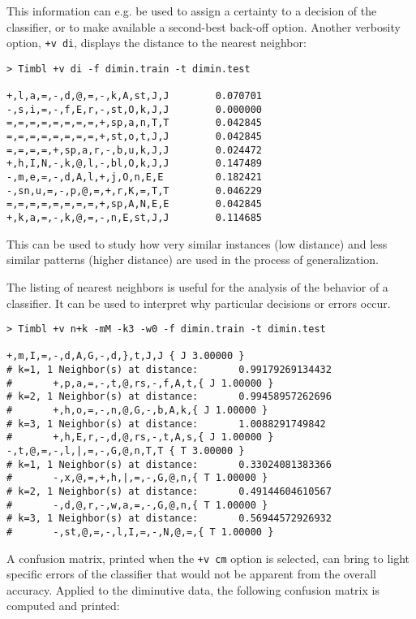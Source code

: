 \documentclass{report}
\begin{document}
This information can e.g. be used to assign a certainty to a decision
of the classifier, or to make available a second-best back-off option. Another verbosity option, {\tt +v di}, displays the distance to the nearest neighbor:

{\footnotesize
\begin{verbatim}
> Timbl +v di -f dimin.train -t dimin.test

+,l,a,=,-,d,@,=,-,k,A,st,J,J        0.070701
-,s,i,=,-,f,E,r,-,st,O,k,J,J        0.000000
=,=,=,=,=,=,=,=,+,sp,a,n,T,T        0.042845
=,=,=,=,=,=,=,=,+,st,o,t,J,J        0.042845
=,=,=,=,+,sp,a,r,-,b,u,k,J,J        0.024472
+,h,I,N,-,k,@,l,-,bl,O,k,J,J        0.147489
-,m,e,=,-,d,A,l,+,j,O,n,E,E         0.182421
-,sn,u,=,-,p,@,=,+,r,K,=,T,T        0.046229
=,=,=,=,=,=,=,=,+,sp,A,N,E,E        0.042845
+,k,a,=,-,k,@,=,-,n,E,st,J,J        0.114685        
\end{verbatim}
}

This can be used to study how very similar instances (low distance) and
less similar patterns (higher distance) are used in the process of
generalization.

The listing of nearest neighbors is useful for the analysis of the
behavior of a classifier. It can be used to interpret why particular
decisions or errors occur.

{\footnotesize
\begin{verbatim}
> Timbl +v n+k -mM -k3 -w0 -f dimin.train -t dimin.test

+,m,I,=,-,d,A,G,-,d,},t,J,J { J 3.00000 }
# k=1, 1 Neighbor(s) at distance:       0.99179269134432
#       +,p,a,=,-,t,@,rs,-,f,A,t,{ J 1.00000 }
# k=2, 1 Neighbor(s) at distance:       0.99458957262696
#       +,h,o,=,-,n,@,G,-,b,A,k,{ J 1.00000 }
# k=3, 1 Neighbor(s) at distance:       1.0088291749842
#       +,h,E,r,-,d,@,rs,-,t,A,s,{ J 1.00000 }
-,t,@,=,-,l,|,=,-,G,@,n,T,T { T 3.00000 }
# k=1, 1 Neighbor(s) at distance:       0.33024081383366
#       -,x,@,=,+,h,|,=,-,G,@,n,{ T 1.00000 }
# k=2, 1 Neighbor(s) at distance:       0.49144604610567
#       -,d,@,r,-,w,a,=,-,G,@,n,{ T 1.00000 }
# k=3, 1 Neighbor(s) at distance:       0.56944572926932
#       -,st,@,=,-,l,I,=,-,N,@,=,{ T 1.00000 }
\end{verbatim}
}

A confusion matrix, printed when the {\tt +v cm} option is selected,
can bring to light specific errors of the classifier that would not be
apparent from the overall accuracy. Applied to the diminutive data,
the following confusion matrix is computed and printed:
\end{document}
